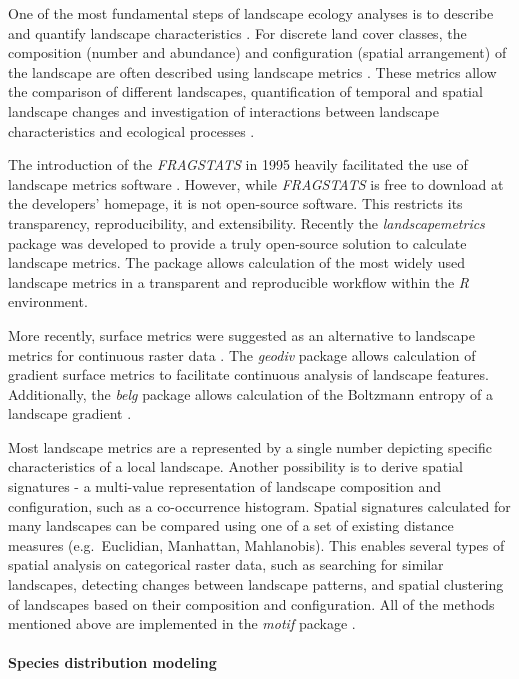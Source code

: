 \documentclass[smallextended]{svjour3}       %
\begin{document}
One of the most fundamental steps of landscape ecology analyses is to describe and quantify landscape characteristics \cite{Turner2005,Lausch2015}.
For discrete land cover classes, the composition (number and abundance) and configuration (spatial arrangement) of the landscape are often described using landscape metrics \cite{Gustafson1998,Uuemaa2009,Uuemaa2013,Gustafson2019}.
These metrics allow the comparison of different landscapes, quantification of temporal and spatial landscape changes and investigation of interactions between landscape characteristics and ecological processes \cite{Uuemaa2009}.

The introduction of the \emph{FRAGSTATS} in 1995 heavily facilitated the use of landscape metrics software \cite{McGarigal2012,Kupfer2012,Gustafson2019}.
However, while \emph{FRAGSTATS} is free to download at the developers' homepage, it is not open-source software.
This restricts its transparency, reproducibility, and extensibility.
Recently the \emph{landscapemetrics} package \cite{Hesselbarth2019a} was developed to provide a truly open-source solution to calculate landscape metrics.
The package allows calculation of the most widely used landscape metrics in a transparent and reproducible workflow within the \emph{R} environment.

More recently, surface metrics were suggested as an alternative to landscape metrics for continuous raster data \cite{McGarigal2009}.
The \emph{geodiv} package \cite{Smith2020} allows calculation of gradient surface metrics to facilitate continuous analysis of landscape features.
Additionally, the \emph{belg} package allows calculation of the Boltzmann entropy of a landscape gradient \cite{R-belgpaper}.

Most landscape metrics are a represented by a single number depicting specific characteristics of a local landscape.
Another possibility is to derive spatial signatures - a multi-value representation of landscape composition and configuration, such as a co-occurrence histogram.
Spatial signatures calculated for many landscapes can be compared using one of a set of existing distance measures (e.g.~Euclidian, Manhattan, Mahlanobis).
This enables several types of spatial analysis on categorical raster data, such as searching for similar landscapes, detecting changes between landscape patterns, and spatial clustering of landscapes based on their composition and configuration.
All of the methods mentioned above are implemented in the \emph{motif} package \cite{R-motif}.

\hypertarget{sec:SDM}{%
\paragraph{Species distribution modeling}\label{sec:SDM}}
\end{document}
